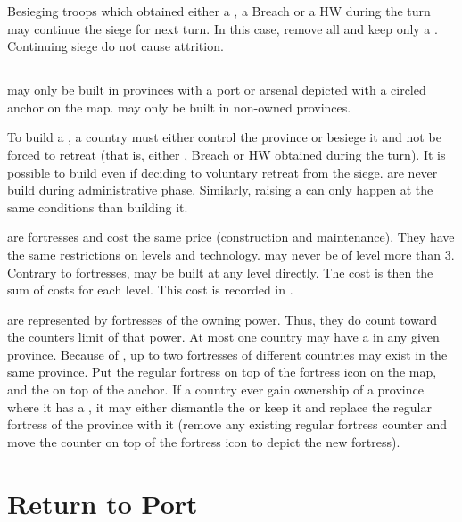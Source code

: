 \bparag Besieging troops which obtained either a \USURE\Faceplus, a Breach or
a HW during the turn may continue the siege for next turn.
\bparag In this case, remove all \USURE and keep only a \USURE\Facemoins.
\bparag Continuing siege do not cause attrition.

\subsection{\Presidios}\label{chRedep:BuildPresidios}
\bparag \Presidios may only be built in provinces with a port or arsenal
depicted with a circled anchor on the map.
\bparag \Presidios may only be built in non-owned provinces.

\bparag To build a \Presidio, a country must either control the province or
besiege it and not be forced to retreat (that is, either \USURE\Faceplus,
Breach or HW obtained during the turn).
\bparag It is possible to build \Presidio even if deciding to voluntary
retreat from the siege.
\bparag \Presidios are never build during administrative phase. Similarly,
raising a \Presidio can only happen at the same conditions than building it.

\aparag[Cost]
\bparag \Presidios are fortresses and cost the same price (construction and
maintenance). They have the same restrictions on levels and technology.
\bparag \Presidios may never be of level more than 3.
\bparag Contrary to fortresses, \Presidios may be built at any level
directly. The cost is then the sum of costs for each level.
\bparag This cost is recorded in .

\bparag \Presidios are represented by fortresses of the owning power. Thus,
they do count toward the counters limit of that power.
\bparag At most one country may have a \Presidio in any given province.
\bparag Because of \Presidios, up to two fortresses of different countries may
exist in the same province. Put the regular fortress on top of the fortress
icon on the map, and the \Presidio on top of the anchor.
\bparag If a country ever gain ownership of a province where it has a
\Presidio, it may either dismantle the \Presidio or keep it and replace the
regular fortress of the province with it (remove any existing regular fortress
counter and move the \Presidio counter on top of the fortress icon to depict
the new fortress).


\section{Return to Port}\label{chRedep:Return port}


